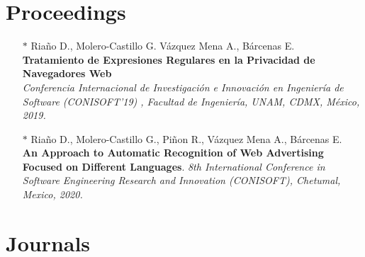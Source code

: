 \documentclass[]{friggeri-cv}
\begin{document}
\section{Proceedings}
\begin{itemize}
    \item [$*$] Riaño D., Molero-Castillo G. Vázquez Mena A., Bárcenas E.\\
    \textbf{Tratamiento de Expresiones Regulares en la Privacidad de Navegadores Web}\\
    \emph{Conferencia Internacional de Investigación e Innovación en Ingeniería de Software (CONISOFT’19) , Facultad de Ingeniería, UNAM, CDMX, México, 2019.}
    
    \item [$*$] Riaño D., Molero-Castillo G., Piñon R., Vázquez Mena A., Bárcenas E.\\
    \textbf{An Approach to Automatic Recognition of Web Advertising Focused on Different Languages}.
    \emph{8th International Conference in Software Engineering Research and Innovation (CONISOFT), Chetumal, Mexico, 2020. 
    }
    \end{itemize}
\section{Journals}
\end{document}
